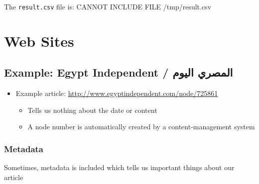 \documentclass[11pt]{article}
\begin{document}
The \texttt{result.csv} file is:
CANNOT INCLUDE FILE /tmp/result.csv
\section{Web Sites}
\label{sec-4}
\subsection{Example: Egypt Independent / المصري اليوم}
\label{sec-4-1}

\begin{itemize}
\item Example article: \href{http://www.egyptindependent.com/node/725861}{http://www.egyptindependent.com/node/725861}
\begin{itemize}
\item Tells us nothing about the date or content
\item A node number is automatically created by a content-management
    system
\end{itemize}
\end{itemize}
\subsubsection{Metadata}
\label{sec-4-1-1}

Sometimes, metadata is included which tells us important things
about our article
\end{document}
